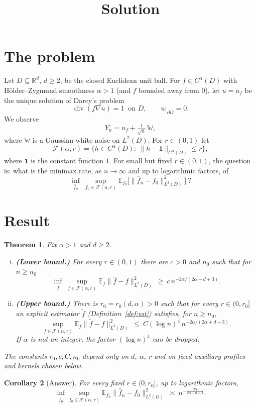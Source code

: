 \documentclass[11pt]{article}
\title{Solution}
\date{}
\author{}
\newtheorem{theorem}{Theorem}[section]
\newtheorem{corollary}[theorem]{Corollary}
\theoremstyle{definition}
\theoremstyle{remark}
\newcommand{\R}{\mathbb R}
\newcommand{\E}{\mathbb E}
\newcommand{\W}{\mathbb W}
\newcommand{\one}{\mathbf 1}
\newcommand{\Fc}{\mathcal F}
\newcommand{\dv}{\operatorname{div}}
\newcommand{\rate}{n^{-2\alpha/(2\alpha+d+3)}}
\begin{document}
\maketitle

\section{The problem}

Let $D\subseteq\R^d$, $d\ge2$, be the closed Euclidean unit ball. For $f\in C^\alpha(D)$ with H\"older--Zygmund smoothness $\alpha>1$ (and $f$ bounded away from $0$), let $u=u_f$ be the unique solution of Darcy's problem
\[
\dv(f\nabla u)=1\ \text{ on }D,\qquad u|_{\partial D}=0 .
\]
We observe
\[
Y_n=u_f+\tfrac1{\sqrt n}\,\W ,
\]
where $\W$ is a Gaussian white noise on $L^2(D)$. For $r\in(0,1)$ let
\[
\Fc(\alpha,r)=\{h\in C^\alpha(D):\ \|h-\one\|_{C^\alpha(D)}\le r\},
\]
where $\one$ is the constant function $1$. For small but fixed $r\in(0,1)$, the question is: what is the minimax rate, as $n\to\infty$ and up to logarithmic factors, of
\[
\inf_{\hat f_n}\ \sup_{f_0\in\Fc(\alpha,r)}\E_{f_0}\big[\|\hat f_n-f_0\|^2_{L^2(D)}\big]\ ?
\]

\section{Result}

\begin{theorem}\label{thm:main}
Fix $\alpha>1$ and $d\ge2$.
\begin{enumerate}[(i)]
\item \textbf{(Lower bound.)} For every $r\in(0,1)$ there are $c>0$ and $n_0$ such that for $n\ge n_0$
\[
\inf_{\hat f}\ \sup_{f\in\Fc(\alpha,r)}\E_f\|\hat f-f\|^2_{L^2(D)}\ \ge\ c\,\rate .
\]
\item \textbf{(Upper bound.)} There is $r_0=r_0(d,\alpha)>0$ such that for every $r\in(0,r_0]$ an explicit estimator $\tilde f$ (Definition~\ref{def:est}) satisfies, for $n\ge n_0$,
\[
\sup_{f\in\Fc(\alpha,r)}\E_f\|\tilde f-f\|^2_{L^2(D)}\ \le\ C(\log n)^4\,\rate .
\]
If $\alpha$ is not an integer, the factor $(\log n)^4$ can be dropped.
\end{enumerate}
The constants $r_0,c,C,n_0$ depend only on $d$, $\alpha$, $r$ and on fixed auxiliary profiles and kernels chosen below.
\end{theorem}

\begin{corollary}[Answer]
For every fixed $r\in(0,r_0]$, up to logarithmic factors,
\[
\inf_{\hat f_n}\sup_{f_0\in\Fc(\alpha,r)}\E_{f_0}\|\hat f_n-f_0\|^2_{L^2(D)}\ \asymp\ n^{-\frac{2\alpha}{2\alpha+d+3}} .
\]
\end{corollary}
\end{document}
